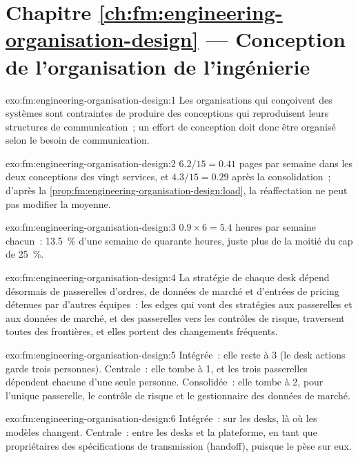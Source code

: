 \section*{Chapitre \ref{ch:fm:engineering-organisation-design} --- Conception de l'organisation de l'ingénierie}

\begin{solution}{exo:fm:engineering-organisation-design:1}
Les organisations qui conçoivent des systèmes sont contraintes de produire des conceptions qui reproduisent leurs structures de communication~; un effort de conception doit donc
être organisé selon le besoin de communication.
\end{solution}

\begin{solution}{exo:fm:engineering-organisation-design:2}
$6.2/15=0.41$ pages par semaine dans les deux conceptions des vingt services, et $4.3/15=0.29$ après la consolidation~; d'après
la \cref{prop:fm:engineering-organisation-design:load}, la réaffectation ne peut pas modifier la moyenne.
\end{solution}

\begin{solution}{exo:fm:engineering-organisation-design:3}
$0.9\times6=5.4$ heures par semaine chacun~: 13.5~\% d'une semaine de quarante heures, juste plus de la moitié du cap de 25~\%.
\end{solution}

\begin{solution}{exo:fm:engineering-organisation-design:4}
La stratégie de chaque desk dépend désormais de passerelles d'ordres, de données de marché et d'entrées de pricing détenues par d'autres équipes~: les edges qui vont des stratégies aux passerelles et aux
données de marché, et des passerelles vers les contrôles de risque, traversent toutes des frontières, et elles portent des changements fréquents.
\end{solution}

\begin{solution}{exo:fm:engineering-organisation-design:5}
Intégrée~: elle reste à 3 (le desk actions garde trois personnes). Centrale~: elle tombe à 1, et les trois passerelles dépendent chacune d'une seule personne.
Consolidée~: elle tombe à 2, pour l'unique passerelle, le contrôle de risque et le gestionnaire des données de marché.
\end{solution}

\begin{solution}{exo:fm:engineering-organisation-design:6}
Intégrée~: sur les desks, là où les modèles changent. Centrale~: entre les desks et la plateforme, en tant que propriétaires des spécifications de transmission (handoff), puisque
le  pèse sur eux.
\end{solution}

